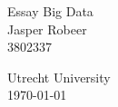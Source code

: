 \documentclass[a4paper, 11pt]{article}
\begin{document}
\begin{titlepage}
    \begin{center}
    {\bigsf Essay Big Data} \\[\baselineskip]
    {\large Jasper Robeer \\ 3802337}
    \end{center}
    \vfill
    {\large Utrecht University} \\
    \today
\end{titlepage}

\end{document}
